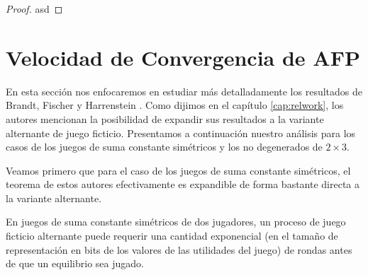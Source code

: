 \begin{proof}
    asd
\end{proof}

\section{Velocidad de Convergencia de AFP}

En esta sección nos enfocaremos en estudiar más detalladamente los resultados de Brandt, Fischer y Harrenstein \cite{brandt:rate:convergence}. Como dijimos en el capítulo \ref{cap:relwork}, los autores mencionan la posibilidad de expandir sus resultados a la variante alternante de juego ficticio. Presentamos a continuación nuestro análisis para los casos de los juegos de suma constante simétricos y los no degenerados de $2 \times 3$.


Veamos primero que para el caso de los juegos de suma constante simétricos, el teorema de estos autores efectivamente es expandible de forma bastante directa a la variante alternante.

\begin{theorem}
    En juegos de suma constante simétricos de dos jugadores, un proceso de juego ficticio alternante puede requerir una cantidad exponencial (en el tamaño de representación en bits de los valores de las utilidades del juego) de rondas antes de que un equilibrio sea jugado.
\end{theorem}


